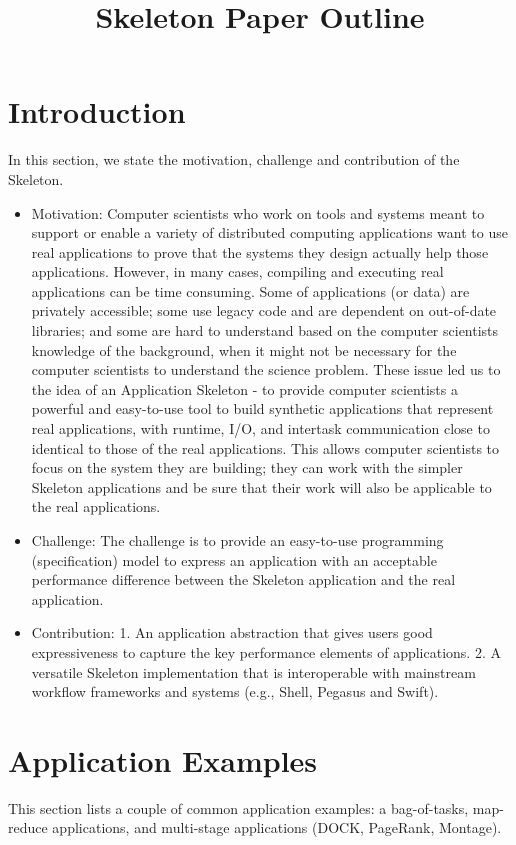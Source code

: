 \documentclass[10pt,a4paper]{article}
\title{Skeleton Paper Outline}
\begin{document}
\maketitle
\section{Introduction}
In this section, we state the motivation, challenge and contribution of the Skeleton.
\begin{itemize}
\item {Motivation}: Computer scientists who work on tools and systems meant to
support or enable a variety of distributed computing applications want to use real
applications to prove that the systems they design actually help those applications.
However, in many cases, compiling and executing real applications can be time
consuming. Some of applications (or data) are privately accessible; some use legacy
code and are dependent on out-of-date libraries; and some are hard to understand
based on the computer scientists knowledge of the background, when it might not
be necessary for the computer scientists to understand the science problem.
These issue led us to the idea of an Application Skeleton - to provide computer
scientists a powerful and easy-to-use tool to build synthetic applications that represent
real applications, with runtime, I/O, and intertask communication close to identical to those of
the real applications. This allows computer scientists to focus on the system they are
building; they can work with the simpler Skeleton applications and be sure that their
work will also be applicable to the real applications.

\item {Challenge}: The challenge is to provide an easy-to-use programming
(specification) model to express an application with an acceptable performance
difference between the Skeleton application and the real application.

\item {Contribution}: 1. An application abstraction that gives users good expressiveness
to capture the key performance elements of applications. 2. A versatile Skeleton
implementation that is interoperable with mainstream workflow frameworks and
systems (e.g., Shell, Pegasus and Swift).

\end{itemize}

\section{Application Examples}
This section lists a couple of common application examples: a bag-of-tasks, map-reduce applications, and multi-stage applications (DOCK, PageRank, Montage).
\end{document}
